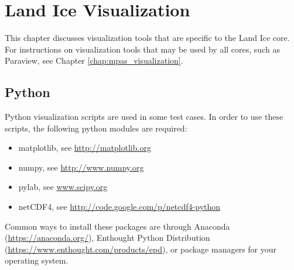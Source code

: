 \chapter{Land Ice Visualization}
\label{chap:landice_visualization}

This chapter discusses visualization tools that are specific to the Land Ice core.  For instructions on visualization tools that may be used by all cores, such as Paraview, see Chapter \ref{chap:mpas_visualization}.

\section{Python}
\label{sec:landice_python}

Python visualization scripts are used in some test cases.  In order to use these scripts, the following python modules are required:
\begin{itemize}
\item matplotlib, see \url{http://matplotlib.org}
\item numpy, see \url{http://www.numpy.org}
\item pylab, see \url{www.scipy.org}
\item netCDF4, see \url{http://code.google.com/p/netcdf4-python}
\end{itemize}
Common ways to install these packages are through Anaconda (\url{https://anaconda.org/}), Enthought Python Distribution (\url{https://www.enthought.com/products/epd}),
or package managers for your operating system.

